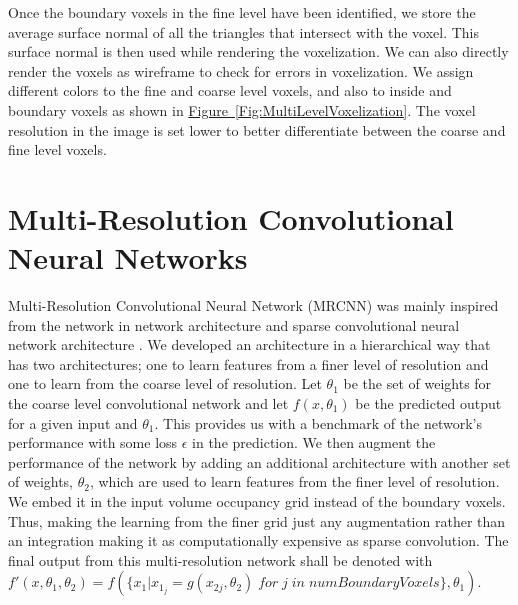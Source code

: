 \documentclass[10pt,letterpaper]{article}
\newcommand{\cref}[2]{\hyperref[#2]{#1~\ref*{#2}}}
\begin{document}
Once the boundary voxels in the fine level have been identified, we store the average surface normal of all the triangles that intersect with the voxel. This surface normal is then used while rendering the voxelization. We can also directly render the voxels as wireframe to check for errors in voxelization. We assign different colors to the fine and coarse level voxels, and also to inside and boundary voxels as shown in \cref{Figure}{Fig:MultiLevelVoxelization}. The voxel resolution in the image is set lower to better differentiate between the coarse and fine level voxels. 


%

\section{Multi-Resolution Convolutional Neural Networks}
\label{Sec:MRCNN}

Multi-Resolution Convolutional Neural Network (MRCNN) was mainly inspired from the network in network architecture and sparse convolutional neural network architecture . We developed an  architecture in a hierarchical way that has two architectures; one to learn features from a finer level of resolution and one to learn from the coarse level of resolution. Let $\theta_1$ be the set of weights for the coarse level convolutional network and let $f(x,\theta_1)$ be the predicted output for a given input and $\theta_1$. This provides us with a benchmark of the network's performance with some loss $\epsilon$ in the prediction. We then augment the performance of the network by adding an additional architecture with another set of weights, $\theta_2$, which are used to learn features from the finer level of resolution. We embed it in the input volume occupancy grid instead of the boundary voxels. Thus, making the learning from the finer grid just any augmentation rather than an integration making it as computationally expensive as sparse convolution. The final output from this multi-resolution network shall be denoted with $f'(x,\theta_1,\theta_2) = f(\{x_1|x_{1_j} = g(x_{2j},\theta_2) \; for \; j \;in \;numBoundaryVoxels\},\theta_1)$.


\end{document}
